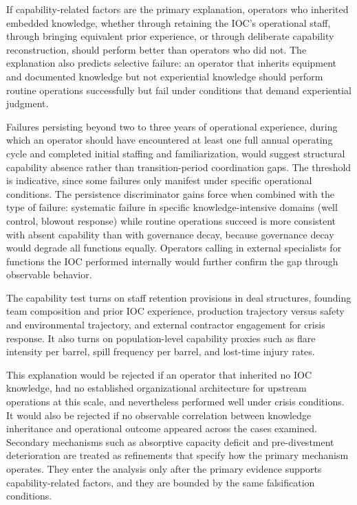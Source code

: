 \documentclass[twoside,fontset=lmodern]{mitthesis}
\begin{document}
If capability-related factors are the primary explanation, operators who
inherited embedded knowledge, whether through retaining the IOC's
operational staff, through bringing equivalent prior experience, or
through deliberate capability reconstruction, should perform better than
operators who did not. The explanation also predicts selective failure:
an operator that inherits equipment and documented knowledge but not
experiential knowledge should perform routine operations successfully
but fail under conditions that demand experiential judgment.

Failures persisting beyond two to three years of operational experience,
during which an operator should have encountered at least one full
annual operating cycle and completed initial staffing and
familiarization, would suggest structural capability absence rather than
transition-period coordination gaps. The threshold is indicative, since
some failures only manifest under specific operational conditions. The
persistence discriminator gains force when combined with the type of
failure: systematic failure in specific knowledge-intensive domains
(well control, blowout response) while routine operations succeed is
more consistent with absent capability than with governance decay,
because governance decay would degrade all functions equally. Operators
calling in external specialists for functions the IOC performed
internally would further confirm the gap through observable behavior.

The capability test turns on staff retention provisions in deal
structures, founding team composition and prior IOC experience,
production trajectory versus safety and environmental trajectory, and
external contractor engagement for crisis response. It also turns on
population-level capability proxies such as flare intensity per barrel,
spill frequency per barrel, and lost-time injury rates.

This explanation would be rejected if an operator that inherited no IOC
knowledge, had no established organizational architecture for upstream
operations at this scale, and nevertheless performed well under crisis
conditions. It would also be rejected if no observable correlation
between knowledge inheritance and operational outcome appeared across
the cases examined. Secondary mechanisms such as absorptive capacity
deficit and pre-divestment deterioration are treated as refinements that
specify how the primary mechanism operates. They enter the analysis only
after the primary evidence supports capability-related factors, and they
are bounded by the same falsification conditions.
\end{document}
